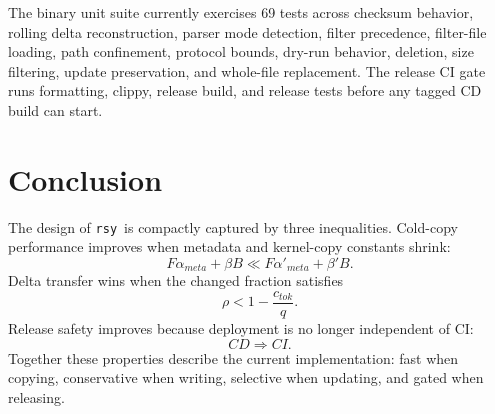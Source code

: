 \documentclass[11pt]{article}
\newcommand{\rsy}{\texttt{rsy}}
\begin{document}
The binary unit suite currently exercises 69 tests across checksum behavior, rolling delta reconstruction, parser mode detection, filter precedence, filter-file loading, path confinement, protocol bounds, dry-run behavior, deletion, size filtering, update preservation, and whole-file replacement. The release CI gate runs formatting, clippy, release build, and release tests before any tagged CD build can start.

\section{Conclusion}

The design of \rsy\ is compactly captured by three inequalities. Cold-copy performance improves when metadata and kernel-copy constants shrink:
\[
  F\alpha_{meta}+\beta B \ll F\alpha'_{meta}+\beta'B.
\]
Delta transfer wins when the changed fraction satisfies
\[
  \rho < 1-\frac{c_{tok}}{q}.
\]
Release safety improves because deployment is no longer independent of CI:
\[
  CD \Rightarrow CI.
\]
Together these properties describe the current implementation: fast when copying, conservative when writing, selective when updating, and gated when releasing.
\end{document}
